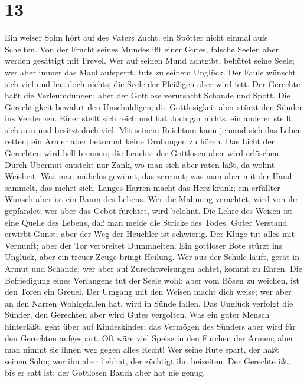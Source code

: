 \hypertarget{section-12}{%
\section{13}\label{section-12}}

 Ein weiser Sohn hört auf des Vaters Zucht, ein Spötter
nicht einmal aufs Schelten.  Von der Frucht seines Mundes
ißt einer Gutes, falsche Seelen aber werden gesättigt mit Frevel.
 Wer auf seinen Mund achtgibt, behütet seine Seele; wer
aber immer das Maul aufsperrt, tut\textquotesingle s zu seinem Unglück.
 Der Faule wünscht sich viel und hat doch nichts; die
Seele der Fleißigen aber wird fett.  Der Gerechte haßt die
Verleumdungen; aber der Gottlose verursacht Schande und Spott.
 Die Gerechtigkeit bewahrt den Unschuldigen; die
Gottlosigkeit aber stürzt den Sünder ins Verderben.  Einer
stellt sich reich und hat doch gar nichts, ein anderer stellt sich arm
und besitzt doch viel.  Mit seinem Reichtum kann jemand
sich das Leben retten; ein Armer aber bekommt keine Drohungen zu hören.
 Das Licht der Gerechten wird hell brennen; die Leuchte
der Gottlosen aber wird erlöschen.  Durch Übermut
entsteht nur Zank, wo man sich aber raten läßt, da wohnt Weisheit.
 Was man mühelos gewinnt, das zerrinnt; was man aber mit
der Hand sammelt, das mehrt sich.  Langes Harren macht
das Herz krank; ein erfüllter Wunsch aber ist ein Baum des Lebens.
 Wer die Mahnung verachtet, wird von ihr gepfändet; wer
aber das Gebot fürchtet, wird belohnt.  Die Lehre des
Weisen ist eine Quelle des Lebens, daß man meide die Stricke des Todes.
 Guter Verstand erwirbt Gunst; aber der Weg der Heuchler
ist schwierig.  Der Kluge tut alles mit Vernunft; aber
der Tor verbreitet Dummheiten.  Ein gottloser Bote stürzt
ins Unglück, aber ein treuer Zeuge bringt Heilung.  Wer
aus der Schule läuft, gerät in Armut und Schande; wer aber auf
Zurechtweisungen achtet, kommt zu Ehren.  Die
Befriedigung eines Verlangens tut der Seele wohl; aber vom Bösen zu
weichen, ist den Toren ein Greuel.  Der Umgang mit den
Weisen macht dich weise; wer aber an den Narren Wohlgefallen hat, wird
in Sünde fallen.  Das Unglück verfolgt die Sünder, den
Gerechten aber wird Gutes vergolten.  Was ein guter
Mensch hinterläßt, geht über auf Kindeskinder; das Vermögen des Sünders
aber wird für den Gerechten aufgespart.  Oft wäre viel
Speise in den Furchen der Armen; aber man nimmt sie ihnen weg gegen
alles Recht!  Wer seine Rute spart, der haßt seinen Sohn;
wer ihn aber liebhat, der züchtigt ihn beizeiten.  Der
Gerechte ißt, bis er satt ist; der Gottlosen Bauch aber hat nie genug.

